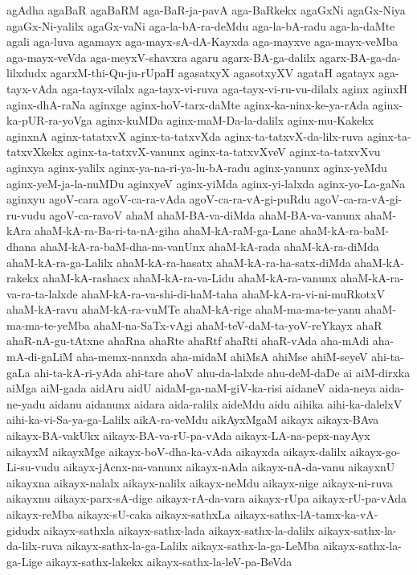 {agAdha
agaBaR
agaBaRM
aga-BaR-ja-pavA
aga-BaRkekx
agaGxNi
agaGx-Niya
agaGx-Ni-yalilx
agaGx-vaNi
aga-la-bA-ra-deMdu
aga-la-bA-radu
aga-la-daMte
agali
aga-luva
agamayx
aga-mayx-sA-dA-Kayxda
aga-mayxve
aga-mayx-veMba
aga-mayx-veVda
aga-meyxV-shavxra
agaru
agarx-BA-ga-dalilx
agarx-BA-ga-da-lilxdudx
agarxM-thi-Qu-ju-rUpaH
agasatxyX
agasotxyXV
agataH
agatayx
aga-tayx-vAda
aga-tayx-vilalx
aga-tayx-vi-ruva
aga-tayx-vi-ru-vu-dilalx
aginx
aginxH
aginx-dhA-raNa
aginxge
aginx-hoV-tarx-daMte
aginx-ka-ninx-ke-ya-rAda
aginx-ka-pUR-ra-yoVga
aginx-kuMDa
aginx-maM-Da-la-dalilx
aginx-mu-Kakekx
aginxnA
aginx-tatatxvX
aginx-ta-tatxvXda
aginx-ta-tatxvX-da-lilx-ruva
aginx-ta-tatxvXkekx
aginx-ta-tatxvX-vanunx
aginx-ta-tatxvXveV
aginx-ta-tatxvXvu
aginxya
aginx-yalilx
aginx-ya-na-ri-ya-lu-bA-radu
aginx-yanunx
aginx-yeMdu
aginx-yeM-ja-la-nuMDu
aginxyeV
aginx-yiMda
aginx-yi-lalxda
aginx-yo-La-gaNa
aginxyu
agoV-cara
agoV-ca-ra-vAda
agoV-ca-ra-vA-gi-puRdu
agoV-ca-ra-vA-gi-ru-vudu
agoV-ca-ravoV
ahaM
ahaM-BA-va-diMda
ahaM-BA-va-vanunx
ahaM-kAra
ahaM-kA-ra-Ba-ri-ta-nA-giha
ahaM-kA-raM-ga-Lane
ahaM-kA-ra-baM-dhana
ahaM-kA-ra-baM-dha-na-vanUnx
ahaM-kA-rada
ahaM-kA-ra-diMda
ahaM-kA-ra-ga-Lalilx
ahaM-kA-ra-hasatx
ahaM-kA-ra-ha-satx-diMda
ahaM-kA-rakekx
ahaM-kA-rashacx
ahaM-kA-ra-va-Lidu
ahaM-kA-ra-vanunx
ahaM-kA-ra-va-ra-ta-lalxde
ahaM-kA-ra-va-shi-di-haM-taha
ahaM-kA-ra-vi-ni-muRkotxV
ahaM-kA-ravu
ahaM-kA-ra-vuMTe
ahaM-kA-rige
ahaM-ma-ma-te-yanu
ahaM-ma-ma-te-yeMba
ahaM-na-SaTx-vAgi
ahaM-teV-daM-ta-yoV-reYkayx
ahaR
ahaR-nA-gu-tAtxne
ahaRna
ahaRte
ahaRtf
ahaRti
ahaR-vAda
aha-mAdi
aha-mA-di-gaLiM
aha-memx-nanxda
aha-midaM
ahiMsA
ahiMse
ahiM-seyeV
ahi-ta-gaLa
ahi-ta-kA-ri-yAda
ahi-tare
ahoV
ahu-da-lalxde
ahu-deM-daDe
ai
aiM-dirxka
aiMga
aiM-gada
aidAru
aidU
aidaM-ga-naM-giV-ka-risi
aidaneV
aida-neya
aida-ne-yadu
aidanu
aidanunx
aidara
aida-ralilx
aideMdu
aidu
aihika
aihi-ka-dalelxV
aihi-ka-vi-Sa-ya-ga-Lalilx
aikA-ra-veMdu
aikAyxMgaM
aikayx
aikayx-BAva
aikayx-BA-vakUkx
aikayx-BA-va-rU-pa-vAda
aikayx-LA-na-pepx-nayAyx
aikayxM
aikayxMge
aikayx-boV-dha-ka-vAda
aikayxda
aikayx-dalilx
aikayx-go-Li-su-vudu
aikayx-jAcnx-na-vanunx
aikayx-nAda
aikayx-nA-da-vanu
aikayxnU
aikayxna
aikayx-nalalx
aikayx-nalilx
aikayx-neMdu
aikayx-nige
aikayx-ni-ruva
aikayxnu
aikayx-parx-sA-dige
aikayx-rA-da-vara
aikayx-rUpa
aikayx-rU-pa-vAda
aikayx-reMba
aikayx-sU-caka
aikayx-sathxLa
aikayx-sathx-lA-tamx-ka-vA-gidudx
aikayx-sathxla
aikayx-sathx-lada
aikayx-sathx-la-dalilx
aikayx-sathx-la-da-lilx-ruva
aikayx-sathx-la-ga-Lalilx
aikayx-sathx-la-ga-LeMba
aikayx-sathx-la-ga-Lige
aikayx-sathx-lakekx
aikayx-sathx-la-leV-pa-BeVda
}
